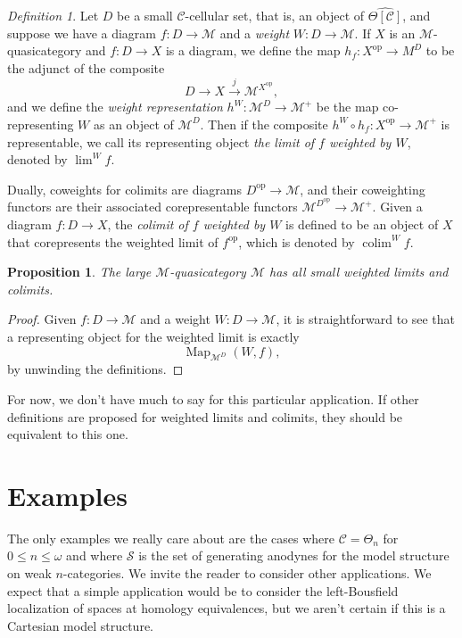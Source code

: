\documentclass{amsart}
\numberwithin{equation}{section}
\theoremstyle{plain}   %
\newtheorem{prop}[subsection]{Proposition}
\theoremstyle{remark}
\newtheorem{defn}[subsection]{Definition}
\theoremstyle{plain}
\DeclareMathOperator{\colim}{colim}
\DeclareMathOperator{\limw}{lim}
\newcommand{\op}{\ensuremath{\mathrm{op}}}
\DeclareMathOperator{\Map}{Map}
\newcommand{\C}{\ensuremath{\mathcal{C}}}
\newcommand{\M}{\ensuremath{\mathcal{M}}}
\newcommand{\setS}{\ensuremath{\mathscr{S}}}
\newcommand{\cellset}{\ensuremath{\widehat{\Theta[\mathcal{C}]}}}
\begin{document}
\begin{defn}
	Let \(D\) be a small \(\C\)-cellular set, that is, an object of \(\cellset\), and suppose we have a diagram \(f:D\to \M\) and a \emph{weight} \(W:D\to \M\).  If \(X\) is an \(\M\)-quasicategory and \(f:D\to X\) is a diagram, we define the map \(h_f: X^\op \to M^D\) to be the adjunct of the composite \[D\to X\xrightarrow{j} \M^{X^\op},\] and we define the \emph{weight representation} \(h^W:\M^D \to \M^+\) be the map co-representing \(W\) as an object of \(\M^D\).  Then if the composite \(h^W\circ h_f:X^\op \to \M^+\) is representable, we call its representing object \emph{the limit of \(f\) weighted by \(W\)}, denoted  by \(\limw^W f\).

	Dually, coweights for colimits are diagrams \(D^\op \to \M\), and their coweighting functors are their associated corepresentable functors \(\M^{D^\op}\to \M^+\).  Given a diagram \(f:D\to X\), the \emph{colimit of \(f\) weighted by \(W\)} is defined to be an object of \(X\) that corepresents the weighted limit of \(f^\op\), which is denoted by \(\colim^W f\).  
\end{defn}

\begin{prop} The large \(\M\)-quasicategory \(\M\) has all small weighted limits and colimits.
\end{prop}
\begin{proof}  Given \(f:D\to \M\) and a weight \(W:D\to \M\), it is straightforward to see that a representing object for the weighted limit is exactly \[\Map_{\M^D}(W,f),\] by unwinding the definitions.
\end{proof}

For now, we don't have much to say for this particular application.  If other definitions are proposed for weighted limits and colimits, they should be equivalent to this one.  

\section{Examples}
The only examples we really care about are the cases where \(\C=\Theta_n\) for \(0\leq n\leq \omega\) and where \(\setS\) is the set of generating anodynes for the model structure on weak \(n\)-categories.  We invite the reader to consider other applications.  We expect that a simple application would be to consider the left-Bousfield localization of spaces at homology equivalences, but we aren't certain if this is a Cartesian model structure.
\end{document}
